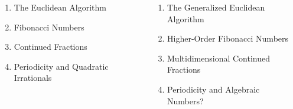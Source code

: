 \documentclass[aspectratio=169]{beamer}
\begin{document}
\begin{frame}
  \small
  \begin{columns}
    \begin{enumerate}
      \item The Euclidean Algorithm
      \item Fibonacci Numbers
      \item Continued Fractions
      \item Periodicity and Quadratic Irrationals
    \end{enumerate}

    \begin{enumerate}
      \item The Generalized Euclidean Algorithm
      \item Higher-Order Fibonacci Numbers
      \item Multidimensional Continued Fractions
      \item Periodicity and Algebraic Numbers?
    \end{enumerate}
  \end{columns}
\end{frame}
\end{document}
